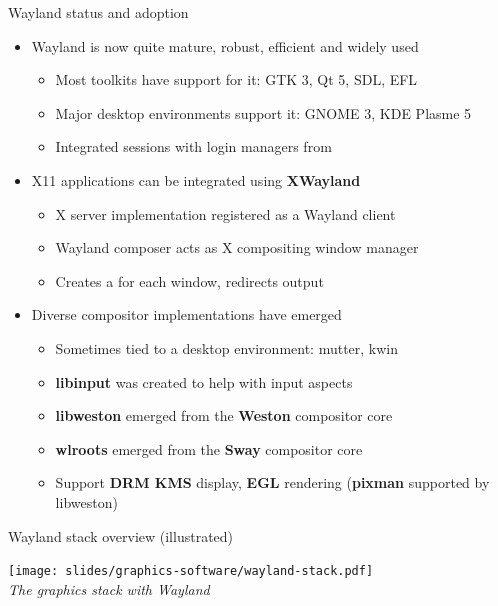 \begin{frame}{Wayland status and adoption}
  \begin{itemize}
  \item Wayland is now quite mature, robust, efficient and widely used
    \begin{itemize}
    \item Most toolkits have support for it: GTK 3, Qt 5, SDL, EFL
    \item Major desktop environments support it: GNOME 3, KDE Plasme 5
    \item Integrated sessions with login managers from 
    \end{itemize}
  \item X11 applications can be integrated using \textbf{XWayland}
    \begin{itemize}
    \item X server implementation registered as a Wayland client
    \item Wayland composer acts as X compositing window manager
    \item Creates a  for each window, redirects output
    \end{itemize}
  \item Diverse compositor implementations have emerged
    \begin{itemize}
    \item Sometimes tied to a desktop environment: mutter, kwin
    \item \textbf{libinput} was created to help with input aspects
    \item \textbf{libweston} emerged from the \textbf{Weston} compositor core
    \item \textbf{wlroots} emerged from the \textbf{Sway} compositor core
    \item Support \textbf{DRM KMS} display, \textbf{EGL} rendering (\textbf{pixman} supported by libweston)
    \end{itemize}
  \end{itemize}
\end{frame}

\begin{frame}{Wayland stack overview (illustrated)}
  \begin{center}
  \texttt{[image: slides/graphics-software/wayland-stack.pdf]}\\
  \textit{\small The graphics stack with Wayland}\\
  \end{center}
\end{frame}

